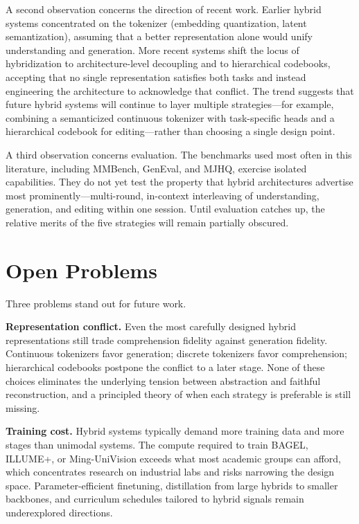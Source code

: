 \documentclass[manuscript,screen,review]{acmart}
\begin{document}
A second observation concerns the direction of recent work. Earlier
hybrid systems concentrated on the tokenizer (embedding quantization,
latent semantization), assuming that a better representation alone
would unify understanding and generation. More recent systems shift
the locus of hybridization to architecture-level decoupling and to
hierarchical codebooks, accepting that no single representation
satisfies both tasks and instead engineering the architecture to
acknowledge that conflict. The trend suggests that future hybrid
systems will continue to layer multiple strategies---for example,
combining a semanticized continuous tokenizer with task-specific heads
and a hierarchical codebook for editing---rather than choosing a
single design point.

A third observation concerns evaluation. The benchmarks used most often
in this literature, including MMBench, GenEval, and MJHQ, exercise
isolated capabilities. They do not yet test the property that hybrid
architectures advertise most prominently---multi-round, in-context
interleaving of understanding, generation, and editing within one
session. Until evaluation catches up, the relative merits of the five
strategies will remain partially obscured.

\section{Open Problems}

Three problems stand out for future work.

\textbf{Representation conflict.} Even the most carefully designed
hybrid representations still trade comprehension fidelity against
generation fidelity. Continuous tokenizers favor generation; discrete
tokenizers favor comprehension; hierarchical codebooks postpone the
conflict to a later stage. None of these choices eliminates the
underlying tension between abstraction and faithful reconstruction, and
a principled theory of when each strategy is preferable is still
missing.

\textbf{Training cost.} Hybrid systems typically demand more training
data and more stages than unimodal systems. The compute required to
train BAGEL, ILLUME+, or Ming-UniVision exceeds what most academic
groups can afford, which concentrates research on industrial labs and
risks narrowing the design space. Parameter-efficient finetuning,
distillation from large hybrids to smaller backbones, and curriculum
schedules tailored to hybrid signals remain underexplored directions.
\end{document}
